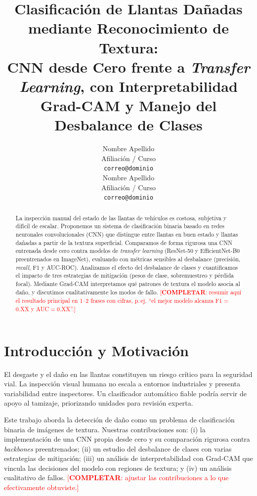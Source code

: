 \documentclass{article}
\title{Clasificación de Llantas Dañadas mediante Reconocimiento de Textura:\\
       CNN desde Cero frente a \emph{Transfer Learning}, con Interpretabilidad
       Grad-CAM y Manejo del Desbalance de Clases}
\author{%
  Nombre Apellido \\
  Afiliación / Curso \\
  \texttt{correo@dominio} \\
  \And
  Nombre Apellido \\
  Afiliación / Curso \\
  \texttt{correo@dominio} \\
}
\newcommand{\TODO}[1]{\textcolor{red}{[\textbf{COMPLETAR}: #1]}}
\begin{document}
\maketitle

\begin{abstract}
La inspección manual del estado de las llantas de vehículos es costosa, subjetiva
y difícil de escalar. Proponemos un sistema de clasificación binaria basado en redes
neuronales convolucionales (CNN) que distingue entre llantas en buen estado y
llantas dañadas a partir de la textura superficial. Comparamos de forma rigurosa una
CNN entrenada desde cero contra modelos de \emph{transfer learning}
(ResNet-50 y EfficientNet-B0 preentrenados en ImageNet), evaluando con métricas
sensibles al desbalance (precisión, \emph{recall}, F1 y AUC-ROC). Analizamos el efecto
del desbalance de clases y cuantificamos el impacto de tres estrategias de mitigación
(pesos de clase, sobremuestreo y pérdida focal). Mediante Grad-CAM interpretamos qué
patrones de textura el modelo asocia al daño, y discutimos cualitativamente los modos
de fallo. \TODO{resumir aquí el resultado principal en 1--2 frases con cifras, p.\,ej.
``el mejor modelo alcanza F1$=$0.XX y AUC$=$0.XX''.}
\end{abstract}

\section{Introducción y Motivación}
El desgaste y el daño en las llantas constituyen un riesgo crítico para la seguridad
vial. La inspección visual humana no escala a entornos industriales y presenta
variabilidad entre inspectores. Un clasificador automático fiable podría servir de
apoyo al tamizaje, priorizando unidades para revisión experta.

Este trabajo aborda la detección de daño como un problema de clasificación binaria de
imágenes de textura. Nuestras contribuciones son: (i) la implementación de una CNN
propia desde cero y su comparación rigurosa contra \emph{backbones} preentrenados;
(ii) un estudio del desbalance de clases con varias estrategias de mitigación;
(iii) un análisis de interpretabilidad con Grad-CAM que vincula las decisiones del
modelo con regiones de textura; y (iv) un análisis cualitativo de fallos.
\TODO{ajustar las contribuciones a lo que efectivamente obtuviste.}
\end{document}
